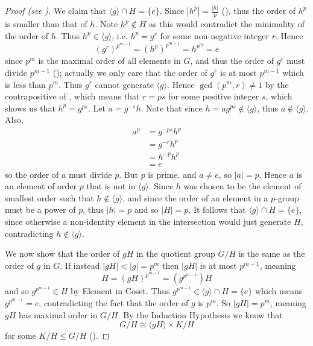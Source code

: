 \begin{proof}[Proof (see {\cite[Lemma 13.9]{judson_beezer_2022}})]
    We claim that $\langle g \rangle \cap H = \{e\}$. Since $|h^p| = \frac{|h|}{p}$ (), thus the order of $h^p$ is smaller than that of $h$. Note $h^p \notin H$ as this would contradict the minimality of the order of $h$. Thus $h^p \in \langle g \rangle$, i.e. $h^p = g^r$ for some non-negative integer $r$. Hence
    \[
        \left(g^r\right)^{p^{m-1}} = \left(h^p\right)^{p^{m-1}} = h^{p^m} = e
    \]
    since $p^m$ is the maximal order of all elements in $G$, and thus the order of $g^r$ must divide $p^{m-1}$ (); actually we only care that the order of $g^r$ is at most $p^{m-1}$ which is less than $p^m$. Thus $g^r$ cannot generate $\langle g \rangle$. Hence $\gcd(p^m, r) \neq 1$ by the contrapositive of , which means that $r = ps$ for some positive integer $s$, which shows us that $h^p = g^{ps}$. Let $a = g^{-s}h$. Note that since $h = ag^{ps} \notin \langle g \rangle$, thus $a \notin \langle g \rangle$. Also,
    \begin{align*}
        a^p &= g^{-ps}h^p\\
        &= g^{-r}h^p\\
        &= h^{-p}h^p\\
        &= e
    \end{align*}
    so the order of $a$ must divide $p$. But $p$ is prime, and $a \neq e$, so $|a| = p$. Hence $a$ is an element of order $p$ that is not in $\langle g \rangle$. Since $h$ was chosen to be the element of smallest order such that $h \notin \langle g \rangle$, and since the order of an element in a $p$-group must be a power of $p$, thus $|h| = p$ and so $|H| = p$. It follows that $\langle g\rangle \cap H = \{e\}$, since otherwise a non-identity element in the intersection would just generate $H$, contradicting $h \notin \langle g\rangle$.

    We now show that the order of $gH$ in the quotient group $G/H$ is the same as the order of $g$ in $G$. If instead $|gH| < |g| = p^m$ then $|gH|$ is at most $p^{m-1}$, meaning
    \[
        H = (gH)^{p^{m-1}} = (g^{p^{m-1}})H
    \]
    and so $g^{p^{m-1}} \in H$ by Element in Coset. Thus $g^{p^{m-1}} \in \langle g\rangle \cap H = \{e\}$ which means $g^{p^{m-1}} = e$, contradicting the fact that the order of $g$ is $p^m$. So $|gH| = p^m$, meaning $gH$ has maximal order in $G/H$. By the Induction Hypothesis we know that
    \[
        G/H \cong \langle gH \rangle \times K/H
    \]
    for some $K/H \leq G/H$ ().


\end{proof}

